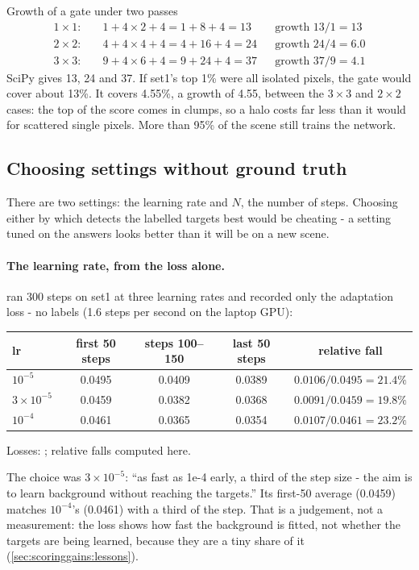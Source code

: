 \begin{worked}[label={we:scoringgains:dilate}]{Growth of a gate under two passes}
\begin{align*}
1 \times 1:\quad & 1 + 4 \times 2 + 4 = 1 + 8 + 4 = 13 &&\text{growth } 13 / 1 = 13\\
2 \times 2:\quad & 4 + 4 \times 4 + 4 = 4 + 16 + 4 = 24 &&\text{growth } 24 / 4 = 6.0\\
3 \times 3:\quad & 9 + 4 \times 6 + 4 = 9 + 24 + 4 = 37 &&\text{growth } 37 / 9 = 4.1
\end{align*}
SciPy gives 13, 24 and 37\tagC. If set1's top 1\% were all isolated pixels, the gate would cover about 13\%. It covers
4.55\%, a growth of 4.55, between the $3 \times 3$ and $2 \times 2$ cases: the top of the score comes in clumps, so a halo
costs far less than it would for scattered single pixels. More than 95\% of the scene still trains the network.
\end{worked}

\subsection{Choosing settings without ground truth}

There are two settings: the learning rate and $N$, the number of steps. Choosing either by which detects the labelled targets
best would be cheating - a setting tuned on the answers looks better than it will be on a new scene.

\paragraph{The learning rate, from the loss alone.}  ran 300 steps on set1 at three learning rates and
recorded only the adaptation loss - no labels (1.6 steps per second on the laptop GPU):
\begin{center}
\small
\begin{tabular}{lcccc}
\toprule
lr & first 50 steps & steps 100--150 & last 50 steps & relative fall \\
\midrule
$10^{-5}$ & 0.0495 & 0.0409 & 0.0389 & $0.0106 / 0.0495 = 21.4\%$ \\
$3 \times 10^{-5}$ & 0.0459 & 0.0382 & 0.0368 & $0.0091 / 0.0459 = 19.8\%$ \\
$10^{-4}$ & 0.0461 & 0.0365 & 0.0354 & $0.0107 / 0.0461 = 23.2\%$ \\
\bottomrule
\end{tabular}

\smallskip
{\footnotesize Losses: ; relative falls computed here\tagC.}
\end{center}
The choice was $3 \times 10^{-5}$: ``as fast as 1e-4 early, a third of the step size - the aim is to learn background without
reaching the targets.'' Its first-50 average (0.0459) matches $10^{-4}$'s (0.0461) with a third of the step. That is a
judgement, not a measurement: the loss shows how fast the background is fitted, not whether the targets are being learned,
because they are a tiny share of it (\cref{sec:scoringgains:lessons}).

